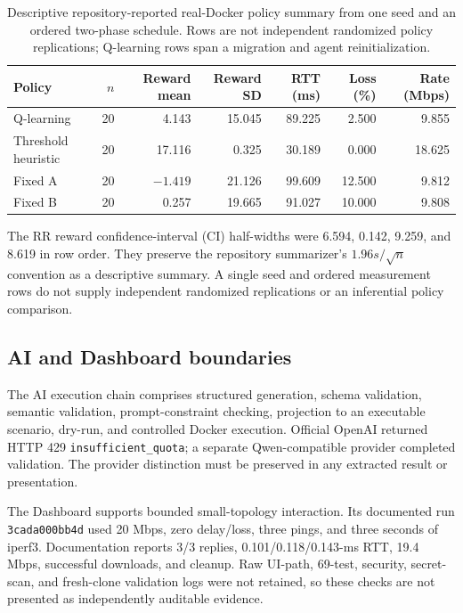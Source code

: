 \begin{table}[h]
\caption{Descriptive repository-reported real-Docker policy summary from one seed and an ordered two-phase schedule. Rows are not independent randomized policy replications; Q-learning rows span a migration and agent reinitialization.}
\label{tab:appendix-rl}
\centering
\begin{tabular}{lrrrrrr}
\hline
Policy & $n$ & Reward mean & Reward SD & RTT (ms) & Loss (\%) & Rate (Mbps) \\
\hline
Q-learning & 20 & 4.143 & 15.045 & 89.225 & 2.500 & 9.855 \\
Threshold heuristic & 20 & 17.116 & 0.325 & 30.189 & 0.000 & 18.625 \\
Fixed A & 20 & $-1.419$ & 21.126 & 99.609 & 12.500 & 9.812 \\
Fixed B & 20 & 0.257 & 19.665 & 91.027 & 10.000 & 9.808 \\
\hline
\end{tabular}
\end{table}

The RR reward confidence-interval (CI) half-widths were 6.594, 0.142, 9.259, and 8.619 in row order. They preserve the repository summarizer's $1.96s/\sqrt{n}$ convention as a descriptive summary. A single seed and ordered measurement rows do not supply independent randomized replications or an inferential policy comparison.

\subsection{AI and Dashboard boundaries}

The AI execution chain comprises structured generation, schema validation, semantic validation, prompt-constraint checking, projection to an executable scenario, dry-run, and controlled Docker execution. Official OpenAI returned HTTP 429 \texttt{insufficient\_quota}; a separate Qwen-compatible provider completed validation. The provider distinction must be preserved in any extracted result or presentation.

The Dashboard supports bounded small-topology interaction. Its documented run \texttt{3cada000bb4d} used 20 Mbps, zero delay/loss, three pings, and three seconds of iperf3. Documentation reports 3/3 replies, 0.101/0.118/0.143-ms RTT, 19.4 Mbps, successful downloads, and cleanup. Raw UI-path, 69-test, security, secret-scan, and fresh-clone validation logs were not retained, so these checks are not presented as independently auditable evidence.

